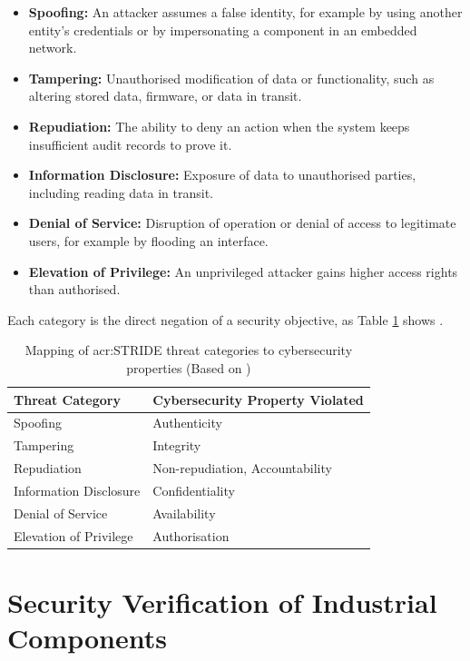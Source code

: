\begin{itemize}
	\item \textbf{Spoofing:} An attacker assumes a false identity, for example by using another entity's credentials or by impersonating a component in an embedded network.
	\item \textbf{Tampering:} Unauthorised modification of data or functionality, such as altering stored data, firmware, or data in transit.
	\item \textbf{Repudiation:} The ability to deny an action when the system keeps insufficient audit records to prove it.
	\item \textbf{Information Disclosure:} Exposure of data to unauthorised parties, including reading data in transit.
	\item \textbf{Denial of Service:} Disruption of operation or denial of access to legitimate users, for example by flooding an interface.
	\item \textbf{Elevation of Privilege:} An unprivileged attacker gains higher access rights than authorised.
\end{itemize}

Each category is the direct negation of a security objective, as Table \ref{tab:stride_mapping} shows \cite[p. 144]{doCarmo2025} \cite{owasp_threat_modeling_process}.
\begin{table}[H]
	\caption[Mapping of \gls{acr:STRIDE} threat categories to cybersecurity Properties]{Mapping of \gls{acr:STRIDE} threat categories to cybersecurity properties (Based on \cite[p. 144]{doCarmo2025} \cite{owasp_threat_modeling_process})}
	\label{tab:stride_mapping}
	\centering
	\begin{tabularx}{\textwidth}{X X}
		\toprule
		\textbf{Threat Category} & \textbf{Cybersecurity Property Violated} \\
		\midrule
		Spoofing & Authenticity \\
		Tampering & Integrity \\
		Repudiation & Non-repudiation, Accountability \\
		Information Disclosure & Confidentiality \\
		Denial of Service & Availability \\
		Elevation of Privilege & Authorisation \\
		\bottomrule
	\end{tabularx}
\end{table}



\section{Security Verification of Industrial Components}
\label{sec:security_testing_approaches}

